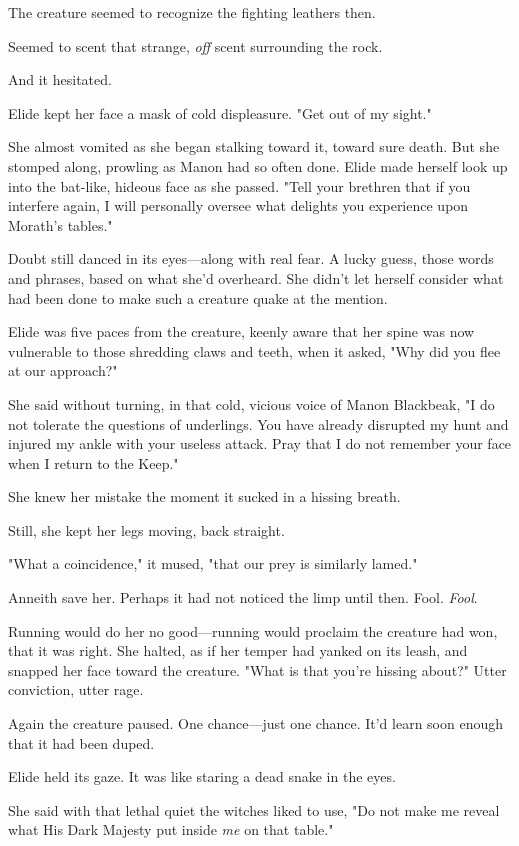 The creature seemed to recognize the fighting leathers then.

Seemed to scent that strange, \emph{off} scent surrounding the rock.

And it hesitated.

Elide kept her face a mask of cold displeasure. "Get out of my sight."

She almost vomited as she began stalking toward it, toward sure death. But she stomped along, prowling as Manon had so often done. Elide made herself look up into the bat-like, hideous face as she passed. "Tell your brethren that if you interfere again, I will personally oversee what delights you experience upon Morath's tables."

Doubt still danced in its eyes---along with real fear. A lucky guess, those words and phrases, based on what she'd overheard. She didn't let herself consider what had been done to make such a creature quake at the mention.

Elide was five paces from the creature, keenly aware that her spine was now vulnerable to those shredding claws and teeth, when it asked, "Why did you flee at our approach?"

She said without turning, in that cold, vicious voice of Manon Blackbeak, "I do not tolerate the questions of underlings. You have already disrupted my hunt and injured my ankle with your useless attack. Pray that I do not remember your face when I return to the Keep."

She knew her mistake the moment it sucked in a hissing breath.

Still, she kept her legs moving, back straight.

"What a coincidence," it mused, "that our prey is similarly lamed."

Anneith save her. Perhaps it had not noticed the limp until then. Fool.
\emph{Fool}.

Running would do her no good---running would proclaim the creature had won, that it was right. She halted, as if her temper had yanked on its leash, and snapped her face toward the creature. "What is that you're hissing about?" Utter conviction, utter rage.

Again the creature paused. One chance---just one chance. It'd learn soon enough that it had been duped.

Elide held its gaze. It was like staring a dead snake in the eyes.

She said with that lethal quiet the witches liked to use, "Do not make me reveal what His Dark Majesty put inside \emph{me} on that table."

